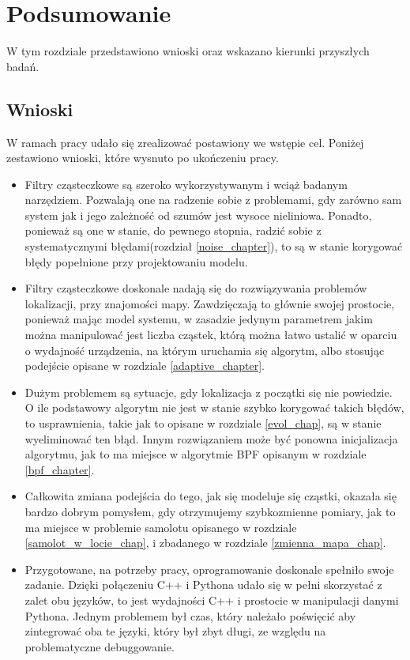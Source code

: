 \chapter{Podsumowanie}
W tym rozdziale przedstawiono wnioski oraz wskazano kierunki przyszłych badań.
\section{Wnioski}
W ramach pracy udało się zrealizować postawiony we wstępie cel. Poniżej zestawiono wnioski, które wysnuto po ukończeniu pracy.
\begin{itemize}
	\item Filtry cząsteczkowe są szeroko wykorzystywanym i wciąż badanym narzędziem. Pozwalają one na radzenie sobie z problemami, gdy zarówno sam system jak i jego zależność od szumów jest wysoce nieliniowa. Ponadto, ponieważ są one w stanie, do pewnego stopnia, radzić sobie z systematycznymi błędami(rozdział \ref{noise_chapter}), to są w stanie korygować błędy popełnione przy projektowaniu modelu.
	\item Filtry cząsteczkowe doskonale nadają się do rozwiązywania problemów lokalizacji, przy znajomości mapy. Zawdzięczają to głównie swojej prostocie, ponieważ mając model systemu, w zasadzie jedynym parametrem jakim można manipulować jest liczba cząstek, którą można łatwo ustalić w oparciu o wydajność urządzenia, na którym uruchamia się algorytm, albo stosując podejście opisane w rozdziale \ref{adaptive_chapter}.
	\item Dużym problemem są sytuacje, gdy lokalizacja z początki się nie powiedzie. O ile podstawowy algorytm nie jest w stanie szybko korygować takich błędów, to usprawnienia, takie jak to opisane w rozdziale \ref{evol_chap}, są w stanie wyeliminować ten błąd. Innym rozwiązaniem może być ponowna inicjalizacja algorytmu, jak to ma miejsce w algorytmie BPF opisanym w rozdziale \ref{bpf_chapter}.
	\item Całkowita zmiana podejścia do tego, jak się modeluje się cząstki, okazała się bardzo dobrym pomysłem, gdy otrzymujemy szybkozmienne pomiary, jak to ma miejsce w problemie samolotu opisanego w rozdziale \ref{samolot_w_locie_chap}, i zbadanego w rozdziale \ref{zmienna_mapa_chap}.
	\item Przygotowane, na potrzeby pracy, oprogramowanie doskonale spełniło swoje zadanie. Dzięki połączeniu C++ i Pythona udało się w pełni skorzystać z zalet obu języków, to jest wydajności C++ i prostocie w manipulacji danymi Pythona. Jednym problemem był czas, który należało poświęcić aby zintegrować oba te języki, który był zbyt długi, ze względu na problematyczne debuggowanie.
\end{itemize}

